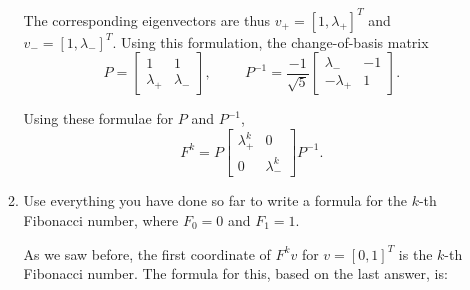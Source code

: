 \documentclass[12pt]{amsart}
\begin{document}
\begin{enumerate}
\begin{enumerate}
The corresponding eigenvectors are thus $v_+ = [1, \lambda_+]^T$ and 
$v_- = [1, \lambda_-]^T$. Using this formulation, the change-of-basis matrix
\[ P = \left[ \begin{array}{cc} 1 & 1 \\ \lambda_+ 
& \lambda_- \end{array} \right], \hspace{1cm} 
P^{-1} =  \frac{-1}{\sqrt{5}}
\left[ \begin{array}{cc} \lambda_- & -1 \\ 
- \lambda_+ & 1  \end{array} \right].\]

Using these formulae for $P$ and $P^{-1}$,
\[F^k = P \left[ \begin{array}{cc} \lambda_+^k & 0 \\ 
0 & \lambda_-^k \end{array} \right] P^{-1}.\]


\item Use everything you have done so far to write a formula
for the $k$-th Fibonacci number, where $F_0 = 0$ and $F_1 = 1$.

\vspace{5mm}

As we saw before, the first coordinate of $F^kv$ 
for $v = [0,1]^T$ is the $k$-th Fibonacci number. 
The formula for this, based on the last answer, is:


\end{enumerate}
\end{enumerate}
\end{document}
